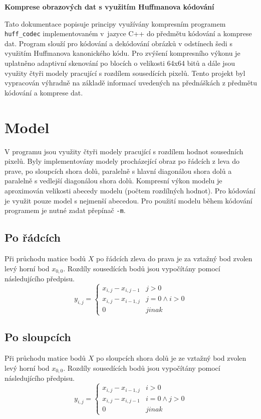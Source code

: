 \documentclass[a4paper, 11pt, fleqn]{scrartcl}
\newcommand{\NAZEV}{\textbf{Komprese obrazových dat s využitím Huffmanova kódování}}
\begin{document}
  \begin{center}
    {\Large \NAZEV}
  \end{center}

  \vspace*{2em}

    Tato dokumentace popisuje principy využívány kompresním programem \texttt{huff\_codec} implementovaném v~jazyce C++ do předmětu kódování a komprese dat. Program slouží pro kódování a dekódování obrázků v odstínech šedi s využitím Huffmanova kanonického kódu. Pro zvýšení kompresního výkonu je uplatněno adaptivní skenování po blocích o velikosti 64x64 bitů a dále jsou využity čtyři modely pracující s rozdílem sousedících pixelů. Tento projekt byl vypracován výhradně na základě informací uvedených na přednáškách z předmětu kódování a komprese dat.

  \section{Model}
    V programu jsou využity čtyři modely pracující s rozdílem hodnot sousedních pixelů. Byly implementovány modely procházející obraz po řádcích z leva do prave, po sloupcích shora dolů, paralelně s hlavní diagonálou shora dolů a paralelně s vedlejší diagonálou shora dolů. Kompresní výkon modelu je aproximován velikosti abecedy modelu (počtem rozdílných hodnot). Pro kódování je využit pouze model s nejmenší abecedou. Pro použití modelu během kódování programem je nutné zadat přepínač \texttt{-m}.

    \subsection{Po řádcích}
      Při průchodu matice bodů $X$ po řádcích zleva do prava je za vztažný bod zvolen levý horní bod $x_{0,0}$. Rozdíly sousedících bodů jsou vypočítány pomocí následujícího předpisu.
      $$
      y_{i,j} = \begin{cases}
                  x_{i,j} - x_{i,j-1}   & j > 0\\
                  x_{i,j} - x_{i-1,j}   & j = 0 \land i > 0\\
                  0                     & jinak
                \end{cases}
      $$

    \subsection{Po sloupcích}
      Při průchodu matice bodů $X$ po sloupcích shora dolů je ze vztažný bod zvolen levý horní bod $x_{0,0}$. Rozdíly sousedících bodů jsou vypočítány pomocí následujícího předpisu.
      $$
      y_{i,j} = \begin{cases}
                  x_{i,j} - x_{i-1,j}   & i > 0\\
                  x_{i,j} - x_{i,j-1}   & i = 0 \land j > 0\\
                  0                     & jinak
                \end{cases}
      $$
\end{document}
